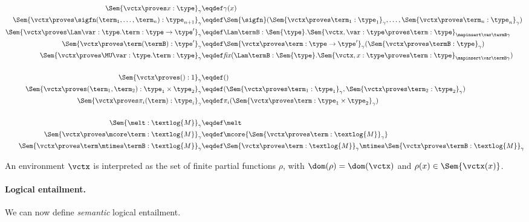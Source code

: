 \begin{align*}
	\Sem{\vctx \proves x : \type}_\gamma &\eqdef \gamma(x) \\
	\Sem{\vctx \proves \sigfn(\term_1, \dots, \term_n) : \type_{n+1}}_\gamma &\eqdef \Sem{\sigfn}(\Sem{\vctx \proves \term_1 : \type_1}_\gamma, \dots, \Sem{\vctx \proves \term_n : \type_n}_\gamma) \\
	\Sem{\vctx \proves \Lam \var:\type. \term : \type \to \type'}_\gamma &\eqdef
	\Lam \termB : \Sem{\type}. \Sem{\vctx, \var : \type \proves \term : \type}_{\mapinsert \var \termB \gamma} \\
	\Sem{\vctx \proves \term(\termB) : \type'}_\gamma &\eqdef
	\Sem{\vctx \proves \term : \type \to \type'}_\gamma(\Sem{\vctx \proves \termB : \type}_\gamma) \\
	\Sem{\vctx \proves \MU \var:\type. \term : \type}_\gamma &\eqdef
	\mathit{fix}(\Lam \termB : \Sem{\type}. \Sem{\vctx, x : \type \proves \term : \type}_{\mapinsert \var \termB \gamma}) \\
  ~\\
	\Sem{\vctx \proves () : 1}_\gamma &\eqdef () \\
	\Sem{\vctx \proves (\term_1, \term_2) : \type_1 \times \type_2}_\gamma &\eqdef (\Sem{\vctx \proves \term_1 : \type_1}_\gamma, \Sem{\vctx \proves \term_2 : \type_2}_\gamma) \\
	\Sem{\vctx \proves \pi_i(\term) : \type_i}_\gamma &\eqdef \pi_i(\Sem{\vctx \proves \term : \type_1 \times \type_2}_\gamma) \\
  ~\\
        \Sem{ \melt : \textlog{M} }_\gamma &\eqdef \melt \\
	\Sem{\vctx \proves \mcore\term : \textlog{M}}_\gamma &\eqdef \mcore{\Sem{\vctx \proves \term : \textlog{M}}_\gamma} \\
	\Sem{\vctx \proves \term \mtimes \termB : \textlog{M}}_\gamma &\eqdef
	\Sem{\vctx \proves \term : \textlog{M}}_\gamma \mtimes \Sem{\vctx \proves \termB : \textlog{M}}_\gamma
\end{align*}
%

An environment $\vctx$ is interpreted as the set of
finite partial functions $\rho$, with $\dom(\rho) = \dom(\vctx)$ and
$\rho(x)\in\Sem{\vctx(x)}$.

\paragraph{Logical entailment.}
We can now define \emph{semantic} logical entailment.

